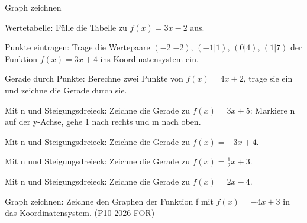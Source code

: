 \begin{aufgabe}{Graph zeichnen}
\begin{teile}
\teil Wertetabelle: Fülle die Tabelle zu $f(x) = 3x - 2$ aus.

\teil Punkte eintragen: Trage die Wertepaare $(-2|-2)$, $(-1|1)$, $(0|4)$, $(1|7)$ der Funktion $f(x) = 3x + 4$ ins Koordinatensystem ein.

\begin{ksys}[xmin=-4,xmax=4,ymin=-4,ymax=8] \end{ksys}
\teil Gerade durch Punkte: Berechne zwei Punkte von $f(x) = 4x + 2$, trage sie ein und zeichne die Gerade durch sie.

\begin{ksys}[xmin=-4,xmax=4,ymin=-4,ymax=7] \end{ksys}
\teil Mit n und Steigungsdreieck: Zeichne die Gerade zu $f(x) = 3x + 5$: Markiere n auf der y-Achse, gehe 1 nach rechts und m nach oben.

\begin{ksys}[xmin=-4,xmax=4,ymin=-4,ymax=9] \end{ksys}
\teil Mit n und Steigungsdreieck: Zeichne die Gerade zu $f(x) = -3x + 4$.

\begin{ksys}[xmin=-4,xmax=4,ymin=-4,ymax=5] \end{ksys}
\teil Mit n und Steigungsdreieck: Zeichne die Gerade zu $f(x) = \frac{1}{2}x + 3$.

\begin{ksys}[xmin=-4,xmax=4,ymin=-4,ymax=5] \end{ksys}
\teil Mit n und Steigungsdreieck: Zeichne die Gerade zu $f(x) = 2x - 4$.

\begin{ksys}[xmin=-4,xmax=4,ymin=-5,ymax=4] \end{ksys}
\teil Graph zeichnen: Zeichne den Graphen der Funktion f mit $f(x) = -4x + 3$ in das Koordinatensystem. \hfill (P10 2026 FOR)

\begin{ksys}[xmin=-4,xmax=4,ymin=-4,ymax=4] \end{ksys}
\end{teile}
\end{aufgabe}

